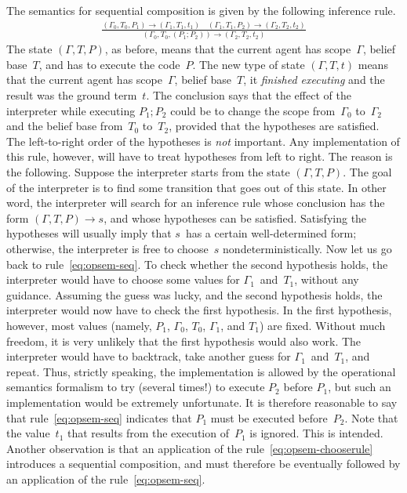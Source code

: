 \documentclass[a4paper,12pt,oneside,fleqn]{book} %
\begin{document}
{The semantics for sequential composition is given by the following
inference rule.
\begin{align}
\frac
  {(\Gamma_0,T_0,P_1)\to(\Gamma_1,T_1,t_1)
  \quad
  (\Gamma_1,T_1,P_2)\to(\Gamma_2,T_2,t_2)}
  {(\Gamma_0,T_0,(P_1;P_2))\to(\Gamma_2,T_2,t_2)}
  \label{eq:opsem-seq}
\end{align}
The state $(\Gamma,T,P)$, as before, means that the current agent has
scope~$\Gamma$, belief base~$T$, and has to execute the code~$P$. The new
type of state $(\Gamma,T,t)$ means that the current agent has
scope~$\Gamma$, belief base~$T$, it \emph{finished executing} and the
result was the ground term~$t$.  The conclusion says that the effect of the
interpreter while executing $P_1;P_2$ could be to change the scope
from~$\Gamma_0$ to~$\Gamma_2$ and the belief base from~$T_0$ to~$T_2$,
provided that the hypotheses are satisfied. The left-to-right order of the
hypotheses is \emph{not} important. Any implementation of this rule,
however, will have to treat hypotheses from left to right. The reason is
the following. Suppose the interpreter starts from the state
$(\Gamma,T,P)$. The goal of the interpreter is to find some transition that
goes out of this state. In other word, the interpreter will search for an
inference rule whose conclusion has the form $(\Gamma,T,P)\to s$, and whose
hypotheses can be satisfied.  Satisfying the hypotheses will usually imply
that $s$~has a certain well-determined form; otherwise, the interpreter is
free to choose~$s$ nondeterministically. Now let us go back to
rule~\eqref{eq:opsem-seq}. To check whether the second hypothesis holds,
the interpreter would have to choose some values for $\Gamma_1$~and~$T_1$,
without any guidance.  Assuming the guess was lucky, and the second
hypothesis holds, the interpreter would now have to check the first
hypothesis. In the first hypothesis, however, most values (namely, $P_1$,
$\Gamma_0$, $T_0$, $\Gamma_1$, and $T_1$) are fixed. Without much freedom,
it is very unlikely that the first hypothesis would also work. The
interpreter would have to backtrack, take another guess for
$\Gamma_1$~and~$T_1$, and repeat. Thus, strictly speaking, the
implementation is allowed by the operational semantics formalism to try
(several times!) to execute $P_2$ before $P_1$, but such an implementation
would be extremely unfortunate. It is therefore reasonable to say that
rule~\eqref{eq:opsem-seq} indicates that $P_1$ must be executed
before~$P_2$. Note that the value~$t_1$ that results from the execution
of~$P_1$ is ignored. This is intended. Another observation is that an
application of the rule~\eqref{eq:opsem-chooserule} introduces a sequential
composition, and must therefore be eventually followed by an application of
the rule~\eqref{eq:opsem-seq}.

}
\end{document}
